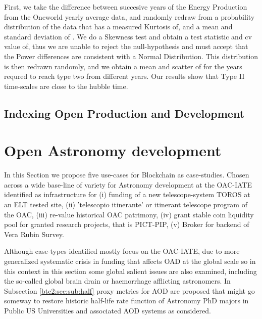 \documentclass[final,5p,times,twocolumn,authoryear]{elsarticle}
\begin{document}
First, we take the difference between succesive years of the Energy Production from the Oneworld yearly average data, and randomly redraw from a probability distribution of the data that has a measured Kurtosis of, and a mean and standard deviation of . We do a Skewness test and obtain a test statistic and cv value of, thus we are unable to reject the null-hypothesis and must accept that the Power differences  are consistent with a Normal Distribution. This distribution is then redrawn randomly, and we obtain a mean and scatter of for the years requred to reach type two from different years. Our results show that Type II  time-scales are close to the hubble time. 

\subsection{Indexing Open Production and Development}
\section{Open Astronomy development}
\label{sec:btc4}

In this Section we propose five use-cases for Blockchain as case-studies. Chosen across a wide base-line of variety for Astronomy development at the OAC-IATE identified as infrastructure for (i) funding of a new telescope-system TOROS at an ELT tested site, (ii) 'telescopio itinerante' or itinerant telescope program of the OAC, (iii) re-value historical OAC patrimony, (iv) grant stable coin liquidity pool for granted research projects, that is PICT-PIP, (v) Broker for backend of Vera Rubin Survey. 

Although case-types identified mostly focus on  the OAC-IATE, due to more generalized systematic crisis in funding that affects OAD at the global scale so in this context in this section some global salient issues are also examined, including the so-called global brain drain or haemorrhage afflicting astronomers. In Subsection \ref{btc2:sec:sub:half} proxy metrics for AOD are proposed that might go someway to restore historic half-life rate function of Astronomy PhD majors in Public US Universities and associated AOD systems as considered. 
\end{document}
